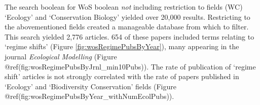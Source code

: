 \documentclass[12pt,twoside,openany]{reedthesis}
\newenvironment{Shaded}{\begin{snugshade}}{\end{snugshade}}
\newcommand{\KeywordTok}[1]{\textcolor[rgb]{0.13,0.29,0.53}{\textbf{#1}}}
\newcommand{\DataTypeTok}[1]{\textcolor[rgb]{0.13,0.29,0.53}{#1}}
\newcommand{\DecValTok}[1]{\textcolor[rgb]{0.00,0.00,0.81}{#1}}
\newcommand{\FloatTok}[1]{\textcolor[rgb]{0.00,0.00,0.81}{#1}}
\newcommand{\CharTok}[1]{\textcolor[rgb]{0.31,0.60,0.02}{#1}}
\newcommand{\StringTok}[1]{\textcolor[rgb]{0.31,0.60,0.02}{#1}}
\newcommand{\OperatorTok}[1]{\textcolor[rgb]{0.81,0.36,0.00}{\textbf{#1}}}
\newcommand{\NormalTok}[1]{#1}
\begin{document}
The search boolean for WoS boolean \emph{not} including restriction to
fields (WC) `Ecology' and `Conservation Biology' yielded over 20,000
results. Restricting to the abovementioned fields created a manageable
database from which to filter. This search yielded 2,776 articles. 654
of these papers included terms relating to `regime shifts' (Figure
\ref{fig:wosRegimePubsByYear}), many appearing in the journal
\emph{Ecological Modelling} (Figure
@ref(fig:wosRegimePubsByJrnl\_min10Pubs)). The rate of publication of
`regime shift' articles is not strongly correlated with the rate of
papers published in `Ecology' and `Biodiversity Conservation' fields
(Figure @ref(fig:wosRegimePubsByYear\_withNumEcolPubs)).
\begin{Shaded}
\end{Shaded}
\end{document}

